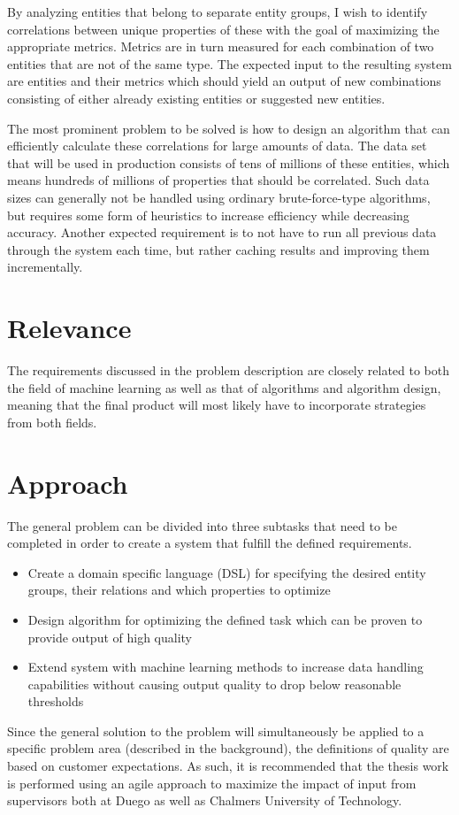 \documentclass{article}
\begin{document}
By analyzing entities that belong to separate entity groups, I wish to identify correlations between unique properties of these with the goal of maximizing the appropriate metrics. Metrics are in turn measured for each combination of two entities that are not of the same type. The expected input to the resulting system are entities and their metrics which should yield an output of new combinations consisting of either already existing entities or suggested new entities.

The most prominent problem to be solved is how to design an algorithm that can efficiently calculate these correlations for large amounts of data. The data set that will be used in production consists of tens of millions of these entities, which means hundreds of millions of properties that should be correlated. Such data sizes can generally not be handled using ordinary brute-force-type algorithms, but requires some form of heuristics to increase efficiency while decreasing accuracy. Another expected requirement is to not have to run all previous data through the system each time, but rather caching results and improving them incrementally.

\section{Relevance}
The requirements discussed in the problem description are closely related to both the field of machine learning as well as that of algorithms and algorithm design, meaning that the final product will most likely have to incorporate strategies from both fields.

\section{Approach}
The general problem can be divided into three subtasks that need to be completed in order to create a system that fulfill the defined requirements.
\begin{itemize}
	\item Create a domain specific language (DSL) for specifying the desired entity groups, their relations and which properties to optimize
	\item Design algorithm for optimizing the defined task which can be proven to provide output of high quality 
	\item Extend system with machine learning methods to increase data handling capabilities without causing output quality to drop below reasonable thresholds
\end{itemize}
Since the general solution to the problem will simultaneously be applied to a specific problem area (described in the background), the definitions of quality are based on customer expectations. As such, it is recommended that the thesis work is performed using an agile approach to maximize the impact of input from supervisors both at Duego as well as Chalmers University of Technology.
\end{document}
